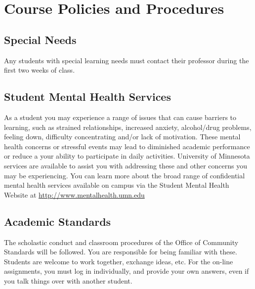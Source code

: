 \documentclass[12pt]{article}
\begin{document}
\section*{\centering Course Policies and Procedures}

\subsection*{Special Needs} Any students with special learning needs must contact their professor during the first two weeks of class.

\subsection*{Student Mental Health Services} As a student you may experience a range of issues that can cause barriers to learning, such as strained relationships, increased anxiety, alcohol/drug problems, feeling down, difficulty concentrating and/or lack of motivation. These mental health concerns or stressful events may lead to diminished academic performance or reduce a your ability to participate in daily activities. University of Minnesota services are available to assist you with addressing these and other concerns you may be experiencing. You can learn more about the broad range of confidential mental health services available on campus via the Student Mental Health Website at \url{http://www.mentalhealth.umn.edu}

\subsection*{Academic Standards} The scholastic conduct and classroom procedures of the Office of Community Standards will be followed. You are responsible for being familiar with these. Students are welcome to work together, exchange ideas, etc.   For the on-line assignments, you must log in individually, and provide your own answers, even if you talk things over with another student.  

\clearpage
\end{document}
